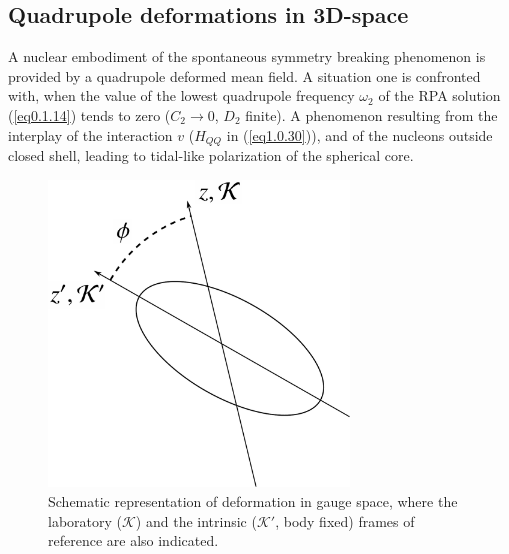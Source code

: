 \documentclass[a4paper,11pt]{book}
\numberwithin{equation}{section}
\numberwithin{figure}{section}
\numberwithin{table}{section}
\begin{document}
\subsection{Quadrupole deformations in 3D-space}
A nuclear embodiment of the spontaneous symmetry breaking phenomenon is provided by a quadrupole deformed  mean field. A situation one is confronted with, when the value of the lowest quadrupole frequency $\omega_2$ of the RPA solution (\ref{eq0.1.14}) tends to zero ($C_2\to0$, $D_2$ finite). A phenomenon resulting from the interplay of the interaction $v$ ($H_{QQ}$ in (\ref{eq1.0.30})), and of the nucleons outside closed shell, leading to tidal-like polarization of the spherical core.
\begin{figure}
	\centerline {
		\includegraphics*[width=8cm, angle=0.]{introduccion/figs/fig0_4_4}
	}
	\caption{Schematic representation of deformation in gauge space, where the laboratory ($\mathcal K$) and the intrinsic ($\mathcal K'$, body fixed) frames of reference are also indicated.}
	\label{fig0.4.4}
\end{figure}
\end{document}
